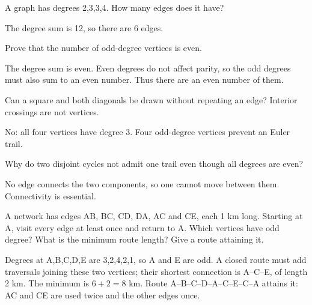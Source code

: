 \documentclass[11pt]{article}
\begin{document}
A graph has degrees 2,3,3,4. How many edges does it have?\par
The degree sum is 12, so there are 6 edges.\par
{}
Prove that the number of odd-degree vertices is even.\par
The degree sum is even. Even degrees do not affect parity, so the odd degrees must also sum to an even number. Thus there are an even number of them.\par
{}
Can a square and both diagonals be drawn without repeating an edge? Interior crossings are not vertices.\par
No: all four vertices have degree 3. Four odd-degree vertices prevent an Euler trail.\par
{}
Why do two disjoint cycles not admit one trail even though all degrees are even?\par
No edge connects the two components, so one cannot move between them. Connectivity is essential.\par
{}
A network has edges AB, BC, CD, DA, AC and CE, each 1 km long. Starting at A, visit every edge at least once and return to A. Which vertices have odd degree? What is the minimum route length? Give a route attaining it.\par
Degrees at A,B,C,D,E are 3,2,4,2,1, so A and E are odd. A closed route must add traversals joining these two vertices; their shortest connection is A--C--E, of length 2 km. The minimum is \(6 + 2 = 8\) km. Route A--B--C--D--A--C--E--C--A attains it: AC and CE are used twice and the other edges once.\par
\end{document}
